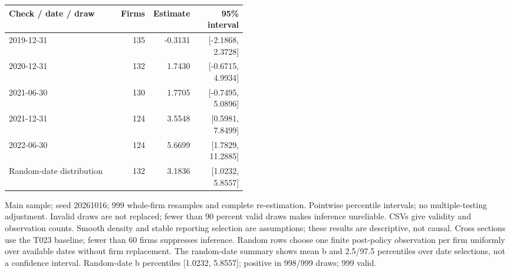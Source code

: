 \begin{threeparttable}
\begin{tabular}{p{0.47\linewidth}rrr}
\toprule
Check / date / draw & Firms & Estimate & 95\% interval \\
\midrule
2019-12-31 & 135 & -0.3131 & [-2.1868, 2.3728] \\
2020-12-31 & 132 & 1.7430 & [-0.6715, 4.9934] \\
2021-06-30 & 130 & 1.7705 & [-0.7495, 5.0896] \\
2021-12-31 & 124 & 3.5548 & [0.5981, 7.8499] \\
2022-06-30 & 124 & 5.6699 & [1.7829, 11.2885] \\
Random-date distribution & 132 & 3.1836 & [1.0232, 5.8557] \\
\bottomrule
\end{tabular}
\begin{tablenotes}[flushleft]\footnotesize
\item[] Main sample; seed 20261016; 999 whole-firm resamples and complete re-estimation. Pointwise percentile intervals; no multiple-testing adjustment. Invalid draws are not replaced; fewer than 90 percent valid draws makes inference unreliable. CSVs give validity and observation counts. Smooth density and stable reporting selection are assumptions; these results are descriptive, not causal. Cross sections use the T023 baseline; fewer than 60 firms suppresses inference. Random rows choose one finite post-policy observation per firm uniformly over available dates without firm replacement. The random-date summary shows mean b and 2.5/97.5 percentiles over date selections, not a confidence interval. Random-date b percentiles [1.0232, 5.8557]; positive in 998/999 draws; 999 valid.
\end{tablenotes}
\end{threeparttable}
\par\medskip
